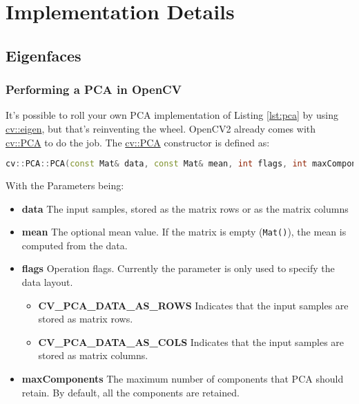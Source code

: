 \section{Implementation Details}
\label{sec:implementation_details}

\subsection{Eigenfaces}
\subsubsection{Performing a PCA in OpenCV}

It's possible to roll your own PCA implementation of Listing \ref{lst:pca} by using \href{http://opencv.willowgarage.com/documentation/cpp/operations_on_arrays.html#cv-eigen}{cv::eigen}, but that's reinventing the wheel. OpenCV2 already comes with \href{http://opencv.willowgarage.com/documentation/cpp/operations_on_arrays.html#pca}{cv::PCA} to do the job. The \href{http://opencv.willowgarage.com/documentation/cpp/operations_on_arrays.html#pca}{cv::PCA} constructor is defined as:

\begin{lstlisting}[language=c++]
cv::PCA::PCA(const Mat& data, const Mat& mean, int flags, int maxComponents=0)
\end{lstlisting}

With the Parameters being:

\begin{itemize}
	\item \textbf{data} The input samples, stored as the matrix rows or as the matrix columns
	\item \textbf{mean} The optional mean value. If the matrix is empty (\lstinline|Mat()|), the mean is computed from the data.
	\item \textbf{flags} Operation flags. Currently the parameter is only used to specify the data layout.
	\begin{itemize}
		\item \textbf{CV\_PCA\_DATA\_AS\_ROWS} Indicates that the input samples are stored as matrix rows.
		\item \textbf{CV\_PCA\_DATA\_AS\_COLS} Indicates that the input samples are stored as matrix columns.
	\end{itemize}
	\item \textbf{maxComponents} The maximum number of components that PCA should retain. By default, all the components are retained.
\end{itemize}

